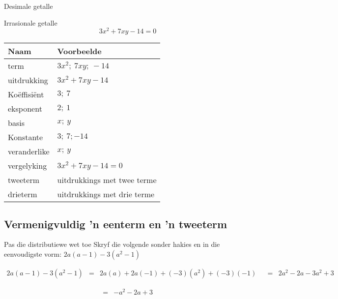 \begin{Aktiwiteit}{Desimale getalle}
\begin{aktiwiteit}{Irrasionale getalle}
\begin{equation*}
3x^2 + 7xy -14 = 0
\end{equation*}



\begin{table}[H]
\begin{center}
\begin{tabular}{|l|l|}
\hline
\textbf{Naam} & \textbf{Voorbeelde} \\
\hline
term & $3x^2;~ 7xy;~ -14$\\ \hline
uitdrukking & $3x^2 + 7xy -14$\\ \hline
Ko\"effisi\"ent & $3;~7$\\ \hline
eksponent & $2;~1$\\ \hline
basis & $x;~y$\\ \hline
Konstante & $3;~7;-14$\\ \hline
veranderlike & $x;~ y$\\ \hline
vergelyking & $3x^2 + 7xy -14 = 0$\\ \hline
tweeterm & uitdrukkings met twee terme\\ \hline
drieterm & uitdrukkings met drie terme \\ \hline


\end{tabular}
\end{center}
\end{table} 

\par

\subsection*{Vermenigvuldig 'n eenterm en 'n tweeterm}

\begin{wex}{Pas die distributiewe wet toe}
{Skryf die volgende sonder hakies en in die eenvoudigste vorm: $2a(a-1) - 3(a^{2}-1)$}
{
\begin{equation*}
\begin{array}{lll} 2a(a-1) -3(a^{2}-1) &=& 2a(a) + 2a(-1) + (-3)(a^{2})+(-3)(-1) &
&=& 2a^{2} - 2a - 3a^{2} + 3
\end{array}
\end{equation*}

\begin{equation*}
\begin{array}{lll} &=& -a^{2} -2a + 3 & 
\end{array}
\end{equation*}
}
\end{wex}


\end{aktiwiteit}
\end{Aktiwiteit}
